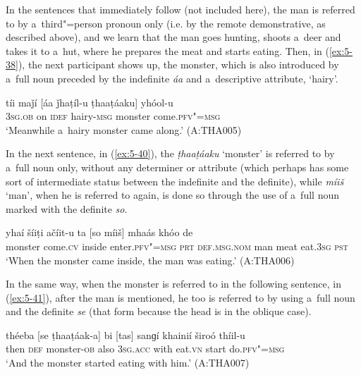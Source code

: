 In the sentences that immediately follow (not included here), the man is referred to by
a~third"=person pronoun only (i.e. by the remote demonstrative, as described above), and we learn
that the man goes hunting, shoots a~deer and takes it to a~hut, where he prepares the meat and
starts eating. Then, in (\ref{ex:5-38}), the next participant shows up, the monster, which is also
introduced by a~full noun preceded by the indefinite \textit{áa} and a~descriptive attribute,
`hairy'.
\begin{exe}
\ex
\label{ex:5-39}
\gll tíi maǰí [áa ǰhaṭíl-u ṭhaaṭáaku] yhóol-u\\
\textsc{3sg.ob} on \textsc{idef} hairy-\textsc{msg} monster come.\textsc{pfv"=msg}\\
\glt `Meanwhile a~hairy monster came along.' (A:THA005)
\end{exe}

In the next sentence, in (\ref{ex:5-40}), the \textit{ṭhaaṭáaku} `monster' is referred to by a~full noun
only, without any determiner or attribute (which perhaps has some sort of intermediate status
between the indefinite and the definite), while \textit{míiš} `man', when he is referred to
again, is done so through the use of a~full noun marked with the definite \textit{so}.
\begin{exe}
\ex
\label{ex:5-40}
\gll [ṭhaaṭáaku] yhaí šíiṭi ačíit-u ta [so míiš] mhaás khóo de\\
monster come.\textsc{cv} inside enter.\textsc{pfv"=msg} \textsc{prt} \textsc{def.msg.nom} man meat eat.\textsc{3sg} \textsc{pst}\\
\glt `When the monster came inside, the man was eating.' (A:THA006)
\end{exe}

In the same way, when the monster is referred to in the following sentence, in (\ref{ex:5-41}), after the man is mentioned, he too is referred to by using a~full noun and the definite \textit{se} (that form because the head is in the oblique case).
\begin{exe}
\ex
\label{ex:5-41}
\gll théeba [se ṭhaaṭáak-a] bi [tas] sanɡí khainií široó thíil-u\\
then \textsc{def} monster-\textsc{ob} also \textsc{3sg.acc} with eat.\textsc{vn} start do.\textsc{pfv"=msg}\\
\glt `And the monster started eating with him.' (A:THA007)
\end{exe}

